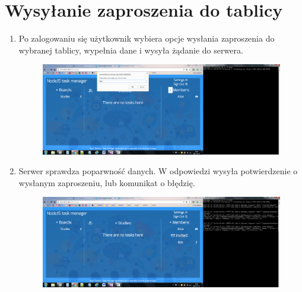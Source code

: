 \documentclass[12pt]{report}
\begin{document}
\section{Wysyłanie zaproszenia do tablicy}
\begin{enumerate}
\item Po zalogowaniu się użytkownik wybiera opcje wysłania zaproszenia do wybranej tablicy, wypełnia dane i wysyła żądanie do serwera.
\begin{figure}[!hb]
\centering
\includegraphics[width=\textwidth,height=\textheight,keepaspectratio]{01.png}
\end{figure}
\item Serwer sprawdza poparwność danych. 
W odpowiedzi wysyła potwierdzenie o wysłanym zaproszeniu, lub komunikat o błędzię.
\begin{figure}[!hb]
\centering
\includegraphics[width=\textwidth,height=\textheight,keepaspectratio]{02.png}
\end{figure}
\end{enumerate}
\end{document}
